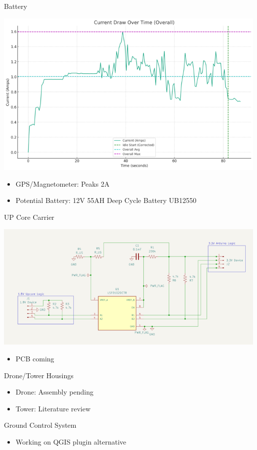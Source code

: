 \begin{frame}{Battery}
    \begin{center}
        \includegraphics[scale=.35]{rtt_images/bd3866b0-51eb-47d6-bb89-32361f4ac01a_720.png}
    \end{center}
    \begin{itemize}
        \item GPS/Magnetometer: Peaks 2A
        \item Potential Battery: 12V 55AH Deep Cycle Battery UB12550
    \end{itemize}
\end{frame}
\begin{frame}{UP Core Carrier}
    \begin{center}
        \includegraphics[scale=.35]{rtt_images/screenshot_2024-02-14_at_1.13.25___pm_720.png}
    \end{center}
    \begin{itemize}
        \item PCB coming
    \end{itemize}
\end{frame}
\begin{frame}{Drone/Tower Housings}
    \begin{itemize}
        \item Drone: Assembly pending
        \item Tower: Literature review
    \end{itemize}
\end{frame}
\begin{frame}{Ground Control System}
    \begin{itemize}
        \item Working on QGIS plugin alternative
    \end{itemize}
\end{frame}